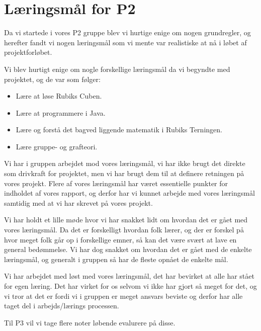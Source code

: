 \section{L\ae{}ringsm\aa{}l for P2}
Da vi startede i vores P2 gruppe blev vi hurtige enige om nogen grundregler, og herefter fandt vi nogen l\ae{}ringsm\aa{}l som vi mente var realistiske at n\aa{} i l\o{}bet af projektforl\o{}bet.

Vi blev hurtigt enige om nogle forskellige l\ae{}ringsm\aa{}l da vi begyndte med projektet, og de var som f\o{}lger:

\begin{itemize}
\item L\ae{}re at l\o{}se Rubiks Cuben.
\item L\ae{}re at programmere i Java.
\item L\ae{}re  og forst\aa{} det bagved liggende matematik i Rubiks Terningen. 
\item L\ae{}re gruppe- og grafteori.
\end{itemize}

Vi har i gruppen arbejdet mod vores l\ae{}ringsm\aa{}l, vi har ikke brugt det direkte som drivkraft for projektet, men vi har brugt dem til at definere retningen p\aa{} vores projekt.
Flere af vores l\ae{}ringsm\aa{}l har v\ae{}ret essentielle punkter for indholdet af vores rapport, og derfor har vi kunnet arbejde med vores l\ae{}ringsm\aa{}l samtidig med at vi har skrevet p\aa{} vores projekt.

Vi har holdt et lille m\o{}de hvor vi har snakket lidt om hvordan det er g\aa{}et med vores l\ae{}ringsm\aa{}l. Da det er forskelligt hvordan folk l\ae{}rer, og der er forskel p\aa{} hvor meget folk g\aa{}r op i forskellige emner, s\aa{} kan det v\ae{}re sv\ae{}rt at lave en general bed\o{}mmelse. Vi har dog snakket om hvordan det er g\aa{}et med de enkelte l\ae{}ringsm\aa{}l, og generalt i gruppen s\aa{} har de fleste opn\aa{}et de enkelte m\aa{}l.

Vi har arbejdet med l\o{}st med vores l\ae{}ringsm\aa{}l, det har bevirket at alle har st\aa{}et for egen l\ae{}ring. Det har virket for os selvom vi ikke har gjort s\aa{} meget for det, og vi tror at det er fordi vi i gruppen er meget ansvars beviste og derfor har alle taget del i arbejds/l\ae{}rings processen.

Til P3 vil vi tage flere noter l\o{}bende evalurere p\aa{} disse.

